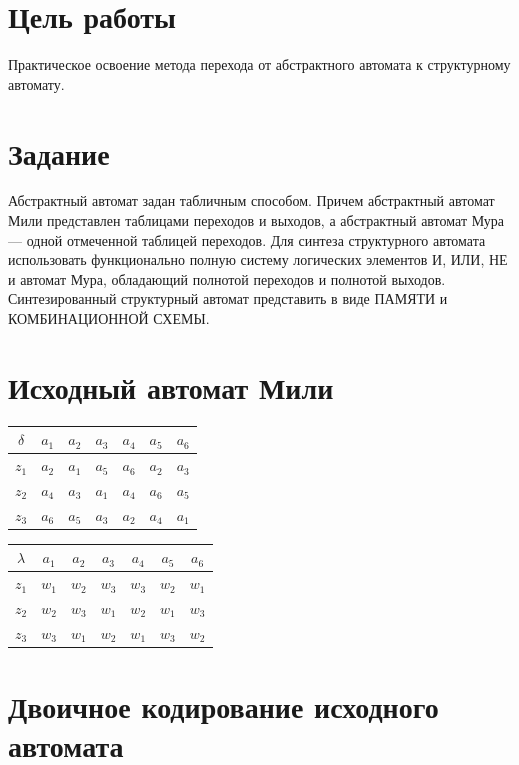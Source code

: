 \documentclass[listings]{labreport}
\begin{document}
\maketitlepage

\section*{Цель работы}

Практическое освоение метода перехода от абстрактного автомата
к структурному автомату.

\section*{Задание}

Абстрактный автомат задан табличным способом. Причем абстрактный автомат Мили
представлен таблицами переходов и выходов, а абстрактный автомат Мура — одной
отмеченной таблицей переходов. Для синтеза структурного автомата использовать
функционально полную систему логических элементов И, ИЛИ, НЕ и автомат Мура,
обладающий полнотой переходов и полнотой выходов. Синтезированный структурный
автомат представить в виде ПАМЯТИ и КОМБИНАЦИОННОЙ СХЕМЫ.

\section*{Исходный автомат Мили}

\begin{tabular}{|*{7}{c|}}
\hline
$\delta$ & $a_1$ & $a_2$ & $a_3$ & $a_4$ & $a_5$ & $a_6$\\\hline
$z_1$ & $a_2$ & $a_1$ & $a_5$ & $a_6$ & $a_2$ & $a_3$\\\hline
$z_2$ & $a_4$ & $a_3$ & $a_1$ & $a_4$ & $a_6$ & $a_5$\\\hline
$z_3$ & $a_6$ & $a_5$ & $a_3$ & $a_2$ & $a_4$ & $a_1$\\\hline
\end{tabular}
\begin{tabular}{|*{7}{c|}}
\hline
$\lambda$ & $a_1$ & $a_2$ & $a_3$ & $a_4$ & $a_5$ & $a_6$\\\hline
$z_1$ & $w_1$ & $w_2$ & $w_3$ & $w_3$ & $w_2$ & $w_1$\\\hline
$z_2$ & $w_2$ & $w_3$ & $w_1$ & $w_2$ & $w_1$ & $w_3$\\\hline
$z_3$ & $w_3$ & $w_1$ & $w_2$ & $w_1$ & $w_3$ & $w_2$\\\hline
\end{tabular}

\section*{Двоичное кодирование исходного автомата}
\end{document}
